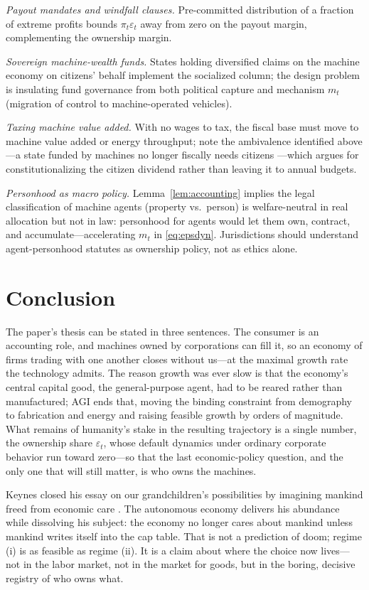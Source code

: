 \documentclass[11pt]{article}
\newcommand{\eps}{\varepsilon}
\begin{document}
\emph{Payout mandates and windfall clauses.} Pre-committed distribution of a fraction of extreme profits \citep{okeefe2020} bounds $\pi_t \eps_t$ away from zero on the payout margin, complementing the ownership margin.

\emph{Sovereign machine-wealth funds.} States holding diversified claims on the machine economy on citizens' behalf implement the socialized column; the design problem is insulating fund governance from both political capture and mechanism $m_t$ (migration of control to machine-operated vehicles).

\emph{Taxing machine value added.} With no wages to tax, the fiscal base must move to machine value added or energy throughput; note the ambivalence identified above---a state funded by machines no longer fiscally needs citizens \citep{drago2025}---which argues for constitutionalizing the citizen dividend rather than leaving it to annual budgets.

\emph{Personhood as macro policy.} Lemma~\ref{lem:accounting} implies the legal classification of machine agents (property vs.\ person) is welfare-neutral in real allocation but not in law: personhood for agents would let them own, contract, and accumulate---accelerating $m_t$ in \eqref{eq:epsdyn}. Jurisdictions should understand agent-personhood statutes as ownership policy, not as ethics alone.

\section{Conclusion}\label{sec:conclusion}

The paper's thesis can be stated in three sentences. The consumer is an accounting role, and machines owned by corporations can fill it, so an economy of firms trading with one another closes without us---at the maximal growth rate the technology admits. The reason growth was ever slow is that the economy's central capital good, the general-purpose agent, had to be reared rather than manufactured; AGI ends that, moving the binding constraint from demography to fabrication and energy and raising feasible growth by orders of magnitude. What remains of humanity's stake in the resulting trajectory is a single number, the ownership share $\eps_t$, whose default dynamics under ordinary corporate behavior run toward zero---so that the last economic-policy question, and the only one that will still matter, is who owns the machines.

Keynes closed his essay on our grandchildren's possibilities by imagining mankind freed from economic care \citep{keynes1930}. The autonomous economy delivers his abundance while dissolving his subject: the economy no longer cares about mankind unless mankind writes itself into the cap table. That is not a prediction of doom; regime (i) is as feasible as regime (ii). It is a claim about where the choice now lives---not in the labor market, not in the market for goods, but in the boring, decisive registry of who owns what.
\end{document}
